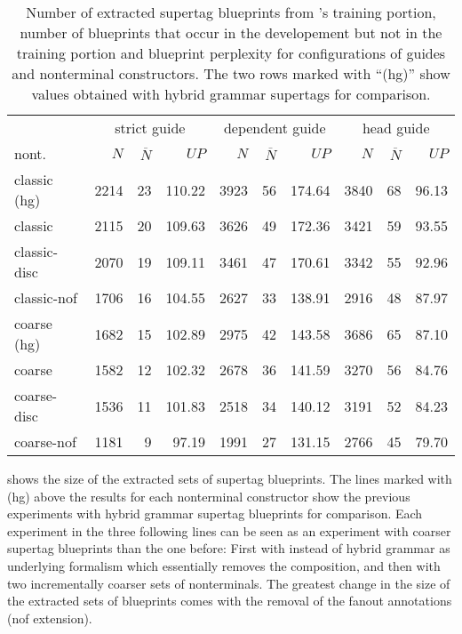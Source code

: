 \documentclass[../../document.tex]{subfiles}
\begin{document}
    \begin{table}
        \caption{\label{tbl:gridsearch:dcp:1}
            Number of extracted  supertag blueprints from \negra{}'s training portion, number of blueprints that occur in the developement but not in the training portion and blueprint perplexity for configurations of guides and nonterminal constructors. The two rows marked with ``(hg)'' show values obtained with hybrid grammar supertags for comparison.
        }
        \centering
        \vspace{.2cm}
        \begin{tabular}{l|rrr|rrr|rrr}
            \toprule
                & \multicolumn{3}{c|}{strict guide} &  \multicolumn{3}{c|}{dependent guide} &  \multicolumn{3}{c}{head guide} \\
nont.           & $N$ & $\overline{N}$ & $\mathit{UP}$ & $N$ & $\overline{N}$ & $\mathit{UP}$ & $N$ & $\overline{N}$ & $\mathit{UP}$ \\ \hline
\rowcolor{black!10}
classic (hg) & 2214 & 23 & 110.22 & 3923 & 56 & 174.64 & 3840 & 68 & 96.13 \\\hline
classic      & 2115 & 20 & 109.63 & 3626 & 49 & 172.36 & 3421 & 59 & 93.55 \\
classic-disc & 2070 & 19 & 109.11 & 3461 & 47 & 170.61 & 3342 & 55 & 92.96 \\
classic-nof  & 1706 & 16 & 104.55 & 2627 & 33 & 138.91 & 2916 & 48 & 87.97 \\  \hline
\rowcolor{black!10}
coarse (hg)  & 1682 & 15 & 102.89 & 2975 & 42 & 143.58 & 3686 & 65 & 87.10 \\\hline
coarse       & 1582 & 12 & 102.32 & 2678 & 36 & 141.59 & 3270 & 56 & 84.76 \\
coarse-disc  & 1536 & 11 & 101.83 & 2518 & 34 & 140.12 & 3191 & 52 & 84.23 \\
coarse-nof   & 1181 & 9  & 97.19  & 1991 & 27 & 131.15 & 2766 & 45 & 79.70 \\
\bottomrule
        \end{tabular}
    \end{table}

     shows the size of the extracted sets of supertag blueprints.
    The lines marked with (hg) above the results for each nonterminal constructor show the previous experiments with hybrid grammar supertag blueprints for comparison.
    Each experiment in the three following lines can be seen as an experiment with coarser supertag blueprints than the one before:
        First with  instead of hybrid grammar as underlying formalism which essentially removes the  composition, and then with two incrementally coarser sets of nonterminals.
    The greatest change in the size of the extracted sets of blueprints comes with the removal of the fanout annotations (nof extension).
\end{document}
